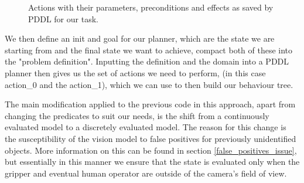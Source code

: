 \begin{figure}

    \caption{Actions with their parameters, preconditions and effects as saved by PDDL for our task.}
    \label{pddlactions}
\end{figure}

We then define an init and goal for our planner, which are the state we are starting from and the final state we want to achieve, compact both of these into the "problem definition". Inputting the definition and the domain into a PDDL planner then gives us the set of actions we need to perform, (in this case action_0 and the action_1), which we can use to then build our behaviour tree.

The main modification applied to the previous code in this approach, apart from changing the predicates to suit our needs, is the shift from a continuously evaluated model to a discretely evaluated model. The reason for this change is the susceptibility of the vision model to false positives for previously unidentified objects. More information on this can be found in section \ref{false_positives_issue}, but essentially in this manner we ensure that the state is evaluated only when the gripper and eventual human operator are outside of the camera's field of view.

